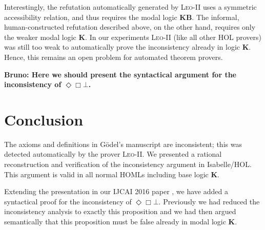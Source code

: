 \documentclass{llncs}
\newcommand{\logic}[1]{\textbf{#1}\xspace}
\newcommand{\KB}{\logic{KB}}
\newcommand{\K}{\logic{K}}
\newcommand{\Dia}{\Diamond} %
\newcommand{\nec}{\Box}
\newcommand{\pos}{\Dia}
\begin{document}
Interestingly, the refutation automatically generated by
\textsc{Leo-II} uses a symmetric accessibility relation, and thus
requires the modal logic \KB. The informal, human-constructed
refutation described above, on the other hand, requires only the
weaker modal logic \K. In our experiments \textsc{Leo-II} (like all
other HOL provers) was still too weak to automatically prove the
inconsistency already in logic \K. Hence, this remains an open problem for automated
theorem provers.



\textbf{Bruno: Here we should present the syntactical argument for the
  inconsistency of $\pos \nec \bot $.}


\section{Conclusion}\label{sec:conclusion}

The axioms and definitions in G\"odel's manuscript are inconsistent;
this was detected automatically by the prover
\textsc{Leo-II}. We presented a rational reconstruction and
verification of the inconsistency argument in Isabelle/HOL. This
argument is valid in all normal HOMLs including base logic \K.

Extending the presentation in our IJCAI 2016 paper \cite{C55}, we have added
a syntactical proof for the inconsistency of  $\pos \nec \bot$.  Previously we had reduced the inconsistency
analysis to exactly this proposition and we had then argued
semantically that this proposition must be false already in modal
logic \K. 


\end{document}
